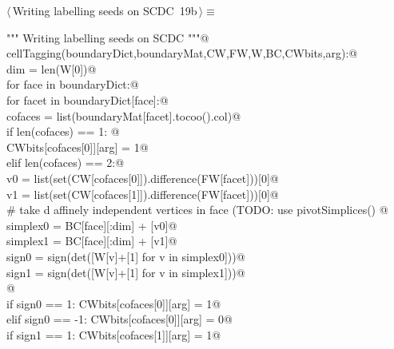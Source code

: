 \documentclass[11pt,oneside]{article}	%
\begin{document}
\begin{flushleft} \small \label{scrap21}
\protect{}$\langle\,$Writing labelling seeds on SCDC\nobreak\ {\footnotesize 19b}$\,\rangle\equiv$
\vspace{-1ex}
\begin{list}{}{} \item
\mbox{}\verb@""" Writing labelling seeds on SCDC """@\\
\mbox{}\verb@def cellTagging(boundaryDict,boundaryMat,CW,FW,W,BC,CWbits,arg):@\\
\mbox{}\verb@   dim = len(W[0])@\\
\mbox{}\verb@   for face in boundaryDict:@\\
\mbox{}\verb@      for facet in boundaryDict[face]:@\\
\mbox{}\verb@         cofaces = list(boundaryMat[facet].tocoo().col)@\\
\mbox{}\verb@         if len(cofaces) == 1: @\\
\mbox{}\verb@            CWbits[cofaces[0]][arg] = 1@\\
\mbox{}\verb@         elif len(cofaces) == 2:@\\
\mbox{}\verb@            v0 = list(set(CW[cofaces[0]]).difference(FW[facet]))[0]@\\
\mbox{}\verb@            v1 = list(set(CW[cofaces[1]]).difference(FW[facet]))[0]@\\
\mbox{}\verb@            # take d affinely independent vertices in face (TODO: use pivotSimplices() @\\
\mbox{}\verb@            simplex0 = BC[face][:dim] + [v0]@\\
\mbox{}\verb@            simplex1 = BC[face][:dim] + [v1]@\\
\mbox{}\verb@            sign0 = sign(det([W[v]+[1] for v in simplex0]))@\\
\mbox{}\verb@            sign1 = sign(det([W[v]+[1] for v in simplex1]))@\\
\mbox{}\verb@            @\\
\mbox{}\verb@            if sign0 == 1: CWbits[cofaces[0]][arg] = 1@\\
\mbox{}\verb@            elif sign0 == -1: CWbits[cofaces[0]][arg] = 0@\\
\mbox{}\verb@            if sign1 == 1: CWbits[cofaces[1]][arg] = 1@\\

\end{list}
\end{flushleft}
\end{document}
